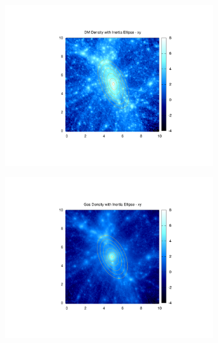 \documentclass[journal]{IEEEtran}
\begin{document}
\begin{figure}[!t]
\centering
	\begin{subfigure}[t]{0.3\textwidth}
		\centering
		\includegraphics[width=\linewidth]{DMDenEllipxy}
	\end{subfigure}
	\quad
	\begin{subfigure}[t]{0.3\textwidth}
		\centering
		\includegraphics[width=\linewidth]{GasDenEllipxy}
	\end{subfigure}
	\quad
	\begin{subfigure}[t]{0.3\textwidth}
		\centering

\end{subfigure}
\end{figure}
\end{document}
